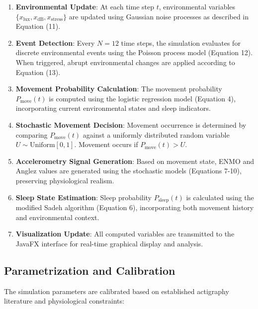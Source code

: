 \documentclass[conference]{IEEEtran}
\begin{document}
\begin{enumerate}
	\item \textbf{Environmental Update}: At each time step $t$, environmental variables $\{x_{\text{lux}}, x_{\text{dB}}, x_{\text{stress}}\}$ are updated using Gaussian noise processes as described in Equation (11).

	\item \textbf{Event Detection}: Every $N = 12$ time steps, the simulation evaluates for discrete environmental events using the Poisson process model (Equation 12). When triggered, abrupt environmental changes are applied according to Equation (13).

	\item \textbf{Movement Probability Calculation}: The movement probability $P_{\text{move}}(t)$ is computed using the logistic regression model (Equation 4), incorporating current environmental states and sleep indicators.

	\item \textbf{Stochastic Movement Decision}: Movement occurrence is determined by comparing $P_{\text{move}}(t)$ against a uniformly distributed random variable $U \sim \text{Uniform}[0,1]$. Movement occurs if $P_{\text{move}}(t) > U$.

	\item \textbf{Accelerometry Signal Generation}: Based on movement state, ENMO and Anglez values are generated using the stochastic models (Equations 7-10), preserving physiological realism.

	\item \textbf{Sleep State Estimation}: Sleep probability $P_{\text{sleep}}(t)$ is calculated using the modified Sadeh algorithm (Equation 6), incorporating both movement history and environmental context.

	\item \textbf{Visualization Update}: All computed variables are transmitted to the JavaFX interface for real-time graphical display and analysis.
\end{enumerate}

\subsection{Parametrization and Calibration}

The simulation parameters are calibrated based on established actigraphy literature and physiological constraints:
\end{document}

